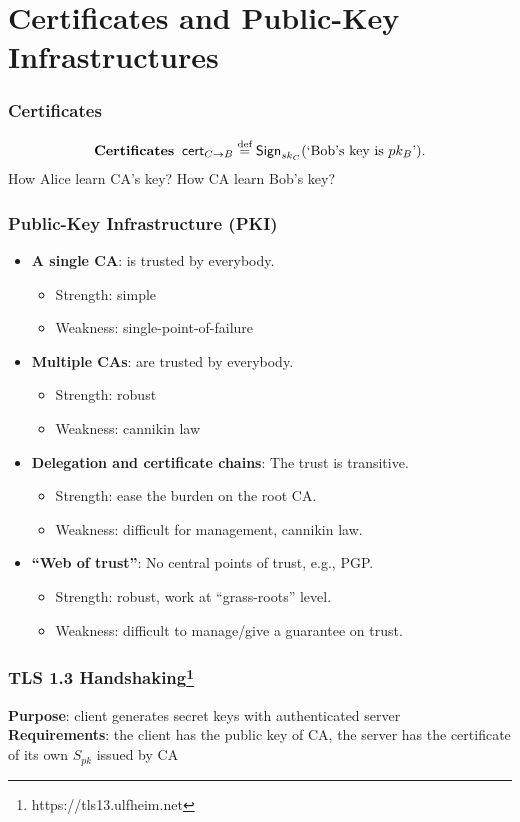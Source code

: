 \section{Certificates and Public-Key Infrastructures}
\begin{frame}\frametitle{Certificates}
\begin{figure}
\begin{center}

\end{center}
\end{figure}
\[\text{\bf Certificates}\;\; \mathsf{cert}_{C\to B} \overset{\text{def}}{=} \mathsf{Sign}_{sk_C}(\text{`Bob's key is } pk_B\text{'}).\]
\alert{How Alice learn CA's key? How CA learn Bob's key?}
\end{frame}
\begin{frame}\frametitle{Public-Key Infrastructure (PKI)}
\begin{itemize}
\item \textbf{A single CA}: is trusted by everybody.
\begin{itemize}
\item Strength: simple
\item Weakness: single-point-of-failure
\end{itemize}
\item \textbf{Multiple CAs}: are trusted by everybody.
\begin{itemize}
\item Strength: robust
\item Weakness: cannikin law
\end{itemize}
\item \textbf{Delegation and certificate chains}: The trust is transitive.
\begin{itemize}
\item Strength: ease the burden on the root CA. 
\item Weakness: difficult for management, cannikin law. 
\end{itemize}
\item \textbf{``Web of trust''}: No central points of trust, e.g., PGP.
\begin{itemize}
\item Strength: robust, work at ``grass-roots'' level. 
\item Weakness: difficult to manage/give a guarantee on trust.
\end{itemize}
\end{itemize}
\end{frame}
\begin{frame}\frametitle{TLS 1.3 Handshaking\footnote{https://tls13.ulfheim.net}}
\textbf{Purpose}: client generates secret keys with authenticated server\\
\textbf{Requirements}: the client has the public key of CA,
the server has the certificate of its own $S_{pk}$ issued by CA
\begin{figure}
\begin{center}

\end{center}
\end{figure}
\end{frame}
